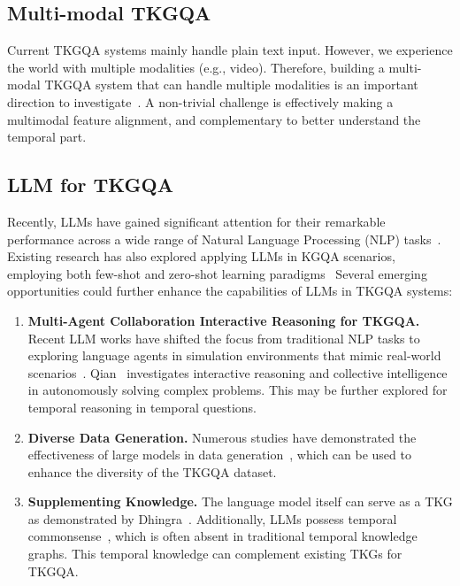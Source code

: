 \subsection{Multi-modal TKGQA} Current TKGQA systems mainly handle plain text input. However, we experience the world with multiple modalities (e.g., video). Therefore, building a multi-modal TKGQA system that can handle multiple modalities is an important direction to investigate~\cite{yuProphetPromptingLarge2023}. 
A non-trivial challenge is effectively making a multimodal feature alignment, and complementary to better understand the temporal part.
\subsection{LLM for TKGQA} Recently, LLMs have gained significant attention for their remarkable performance across a wide range of Natural Language Processing (NLP) tasks~\cite{touvronLlamaOpenFoundation,openaiGPT4TechnicalReport2024,geminiteamGeminiFamilyHighly2024}. Existing research has also explored applying LLMs in KGQA scenarios, employing both few-shot and zero-shot learning paradigms~\cite{nieCodeStyleContextLearning2024,sunThinkGraphDeepResponsible2024, jiangStructGPTGeneralFramework2023a,baekKnowledgeAugmentedLanguageModel2023,liFewshotIncontextLearning2023a,liUnlockingTemporalQuestion2023a}
    Several emerging opportunities could further enhance the capabilities of LLMs in TKGQA systems:
    \begin{enumerate}
        \item \textbf{Multi-Agent Collaboration Interactive Reasoning for TKGQA.} 
    Recent LLM works have shifted the focus from traditional NLP tasks to exploring language agents in simulation environments that mimic real-world scenarios~\cite{zhangTimeArenaShapingEfficient2024}. Qian~\cite{qianScalingLargeLanguageModelbasedMultiAgent2024} investigates interactive reasoning and collective intelligence in autonomously solving complex
    problems. This may be further explored for temporal reasoning in temporal questions.    
    \item \textbf{Diverse Data Generation.} Numerous studies have demonstrated the effectiveness of large models in data generation~\cite{chungIncreasingDiversityMaintaining2023}, which can be used to enhance the diversity of the TKGQA dataset.
    \item \textbf{Supplementing Knowledge.} The language model itself can serve as a TKG as demonstrated by Dhingra~\cite{dhingraTimeAwareLanguageModels2022}. Additionally, LLMs possess temporal commonsense~\cite{chuTimeBenchComprehensiveEvaluation2023}, which is often absent in traditional temporal knowledge graphs. This temporal knowledge can complement existing TKGs for TKGQA.
    \end{enumerate}







